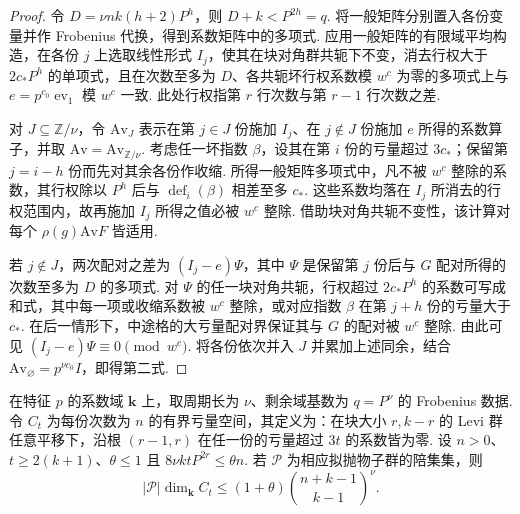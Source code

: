 \begin{proof}
令 $D=\nu nk(h+2)P^h$，则 $D+k<P^{2h}=q$. 将一般矩阵分别置入各份变量并作 Frobenius 代换，得到系数矩阵中的多项式. 应用一般矩阵的有限域平均构造，在各份 $j$ 上选取线性形式 $I_j$，使其在块对角群共轭下不变，消去行权大于 $2c_\ast P^h$ 的单项式，且在次数至多为 $D$、各共轭坏行权系数模 $w^c$ 为零的多项式上与 $e=p^{c_0}\operatorname{ev}_{1}$ 模 $w^c$ 一致. 此处行权指第 $r$ 行次数与第 $r-1$ 行次数之差.

对 $J\subseteq\mathbb Z/\nu$，令 $\mathrm{Av}_J$ 表示在第 $j\in J$ 份施加 $I_j$、在 $j\notin J$ 份施加 $e$ 所得的系数算子，并取 $\mathrm{Av}=\mathrm{Av}_{\mathbb Z/\nu}$. 考虑任一坏指数 $\beta$，设其在第 $i$ 份的亏量超过 $3c_\ast$；保留第 $j=i-h$ 份而先对其余各份作收缩. 所得一般矩阵多项式中，凡不被 $w^c$ 整除的系数，其行权除以 $P^h$ 后与 $\operatorname{def}_i(\beta)$ 相差至多 $c_\ast$. 这些系数均落在 $I_j$ 所消去的行权范围内，故再施加 $I_j$ 所得之值必被 $w^c$ 整除. 借助块对角共轭不变性，该计算对每个 $\rho(g)\mathrm{Av}F$ 皆适用.

若 $j\notin J$，两次配对之差为 $(I_j-e)\Psi$，其中 $\Psi$ 是保留第 $j$ 份后与 $G$ 配对所得的次数至多为 $D$ 的多项式. 对 $\Psi$ 的任一块对角共轭，行权超过 $2c_\ast P^h$ 的系数可写成和式，其中每一项或收缩系数被 $w^c$ 整除，或对应指数 $\beta$ 在第 $j+h$ 份的亏量大于 $c_\ast$. 在后一情形下，中途格的大亏量配对界保证其与 $G$ 的配对被 $w^c$ 整除. 由此可见 $(I_j-e)\Psi\equiv0\pmod{w^c}$. 将各份依次并入 $J$ 并累加上述同余，结合 $\mathrm{Av}_{\varnothing}=p^{\nu c_0}I$，即得第二式.
\end{proof}

\begin{lemma}[拟抛物层指数与有界亏量空间的维数界]
\label{lem:a-edge-defect-count}
\emitthmsource
在特征 $p$ 的系数域 $\mathbf k$ 上，取周期长为 $\nu$、剩余域基数为 $q=P^\nu$ 的 Frobenius 数据. 令 $C_t$ 为每份次数为 $n$ 的有界亏量空间，其定义为：在块大小 $r,k-r$ 的 Levi 群任意平移下，沿根 $(r-1,r)$ 在任一份的亏量超过 $3t$ 的系数皆为零. 设 $n>0$、$t\ge2(k+1)$、$\theta\le1$ 且 $8\nu kt P^{2r}\le\theta n$. 若 $\mathcal P$ 为相应拟抛物子群的陪集集，则
\[
 |\mathcal P|\dim_{\mathbf k} C_t
 \le (1+\theta)\binom{n+k-1}{k-1}^{\nu}.
\]
\end{lemma}

